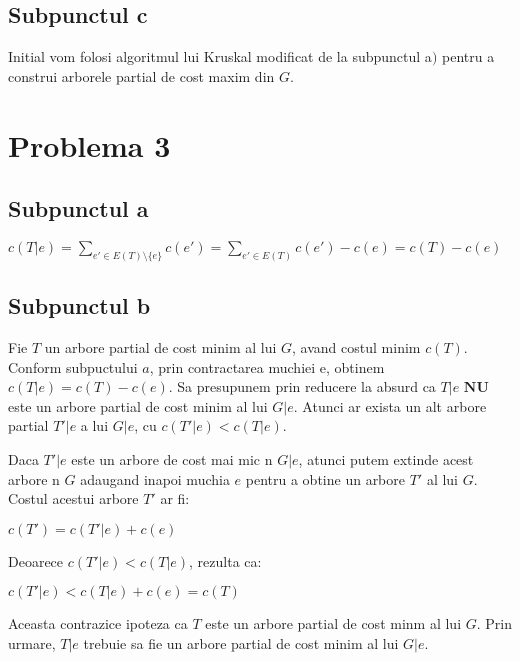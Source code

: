 \documentclass{article}
\begin{document}
\subsection*{\fontsize{16}{30}\selectfont Subpunctul c}
{\fontsize{14}{16}\selectfont Initial vom folosi algoritmul lui Kruskal modificat de la subpunctul a$)$ pentru a construi arborele partial de cost maxim din $G$.}

\section*{\fontsize{20}{50}\selectfont Problema 3}
\subsection*{\fontsize{16}{30}\selectfont Subpunctul a}
{\fontsize{14}{16}\selectfont 

\centerline {$ c(T|e) = \sum_{ e'\in E(T)\setminus \lbrace e \rbrace } c(e') = \sum_{ e'\in E(T) } c(e') - c(e) = c(T) - c(e)$ }
}

\subsection*{\fontsize{16}{30}\selectfont Subpunctul b}
{\fontsize{14}{16}\selectfont 
    Fie $T$ un arbore partial de cost minim al lui $G$, avand costul minim $c(T)$. Conform subpuctului $a$, prin contractarea muchiei e, obtinem $c(T|e) = c(T) - c(e)$.
    Sa presupunem prin reducere la absurd ca $T|e$ $\mathbf{N} \mathbf{U}$ este un arbore partial de cost minim al lui $G|e$. Atunci ar exista un alt arbore partial $T'|e$ a lui $G|e$, cu $c(T'|e) < c(T|e)$.
    \par Daca $T'|e$ este un arbore de cost mai mic n $G|e$, atunci putem extinde acest arbore n $G$ adaugand inapoi muchia $e$ pentru a obtine un arbore $T'$ al lui $G$. Costul acestui arbore $T'$ ar fi:
    \par \centerline { $c(T') = c(T'|e) + c(e)$ }
    \par Deoarece $c(T'|e) < c(T|e)$, rezulta ca:
    \par \centerline {$c(T'|e) < c(T|e) + c(e) = c(T) $}
    \par Aceasta contrazice ipoteza ca $T$ este un arbore partial de cost minm al lui $G$. Prin urmare, $T|e$ trebuie sa fie un arbore partial de cost minim al lui $G|e$.
    }
\end{document}
